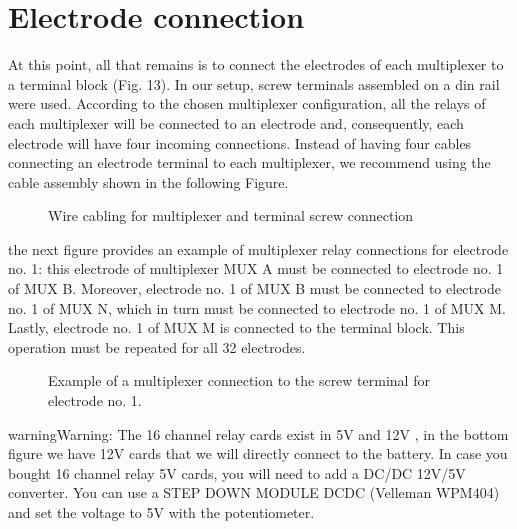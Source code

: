 \documentclass[letterpaper,10pt,english]{sphinxmanual}
\let\sphinxpxdimen\pdfpxdimen\else\newdimen\sphinxpxdimen
\begin{document}
\section{Electrode connection}
\label{\detokenize{V1_01:electrode-connection}}
\sphinxAtStartPar
At this point, all that remains is to connect the electrodes of each multiplexer to a terminal block (Fig. 13). In our set\sphinxhyphen{}up, screw terminals assembled on a din rail were used.
According to the chosen multiplexer configuration, all the relays of each multiplexer will be connected to an electrode and, consequently, each electrode will have four incoming
connections. Instead of having four cables connecting an electrode terminal to each multiplexer, we recommend using the cable assembly shown in the following Figure.

\begin{figure}[htbp]
\centering
\capstart

\noindent\sphinxincludegraphics[width=800\sphinxpxdimen,height=300\sphinxpxdimen]{{cable}.jpg}
\caption{Wire cabling for multiplexer and terminal screw connection}\label{\detokenize{V1_01:id8}}\end{figure}

\sphinxAtStartPar
the next figure provides an example of multiplexer relay connections for electrode no. 1: this electrode of multiplexer MUX A must be connected to electrode no. 1 of MUX B. Moreover, electrode no. 1 of MUX B
must be connected to electrode no. 1 of MUX N, which in turn must be connected to electrode no. 1 of MUX M. Lastly, electrode no. 1 of MUX M is connected to the terminal block.
This operation must be repeated for all 32 electrodes.

\begin{figure}[htbp]
\centering
\capstart

\noindent\sphinxincludegraphics[width=800\sphinxpxdimen,height=800\sphinxpxdimen]{{electrode_cable}.jpg}
\caption{Example of a multiplexer connection to the screw terminal for electrode no. 1.}\label{\detokenize{V1_01:id9}}\end{figure}

\begin{sphinxadmonition}{warning}{Warning:}
\sphinxAtStartPar
The 16 channel relay cards exist in 5\sphinxhyphen{}V and 12\sphinxhyphen{}V , in the bottom figure we have 12\sphinxhyphen{}V cards that we will directly connect to the battery.
In case you bought 16 channel relay 5\sphinxhyphen{}V cards, you will need to add a DC/DC 12\sphinxhyphen{}V/5\sphinxhyphen{}V converter. You can use a STEP DOWN MODULE DC\sphinxhyphen{}DC (Velleman WPM404) and set the voltage to 5V with the potentiometer.
\end{sphinxadmonition}
\end{document}
